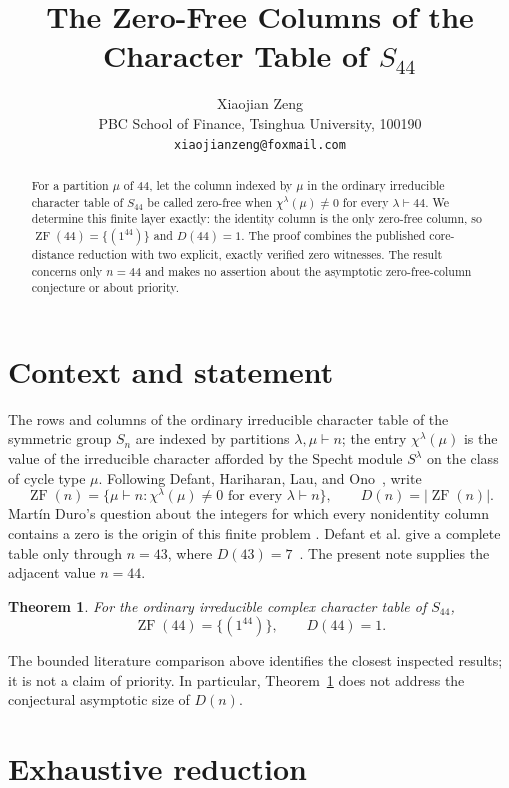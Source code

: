 \documentclass[11pt]{article}
\title{The Zero-Free Columns of the Character Table of $S_{44}$}
\author{Xiaojian Zeng\\
PBC School of Finance, Tsinghua University, 100190\\
\texttt{xiaojianzeng@foxmail.com}}
\date{}
\newtheorem{theorem}{Theorem}
\newcommand{\ZF}{\operatorname{ZF}}
\begin{document}
\maketitle

\begin{abstract}
For a partition $\mu$ of $44$, let the column indexed by $\mu$ in the
ordinary irreducible character table of $S_{44}$ be called zero-free when
$\chi^\lambda(\mu)\ne0$ for every $\lambda\vdash44$.  We determine this
finite layer exactly: the identity column is the only zero-free column, so
$\ZF(44)=\{(1^{44})\}$ and $D(44)=1$.  The proof combines the published
core-distance reduction with two explicit, exactly verified zero witnesses.
The result concerns only $n=44$ and makes no assertion about the asymptotic
zero-free-column conjecture or about priority.
\end{abstract}

\section{Context and statement}

The rows and columns of the ordinary irreducible character table of the
symmetric group $S_n$ are indexed by partitions $\lambda,\mu\vdash n$; the
entry $\chi^\lambda(\mu)$ is the value of the irreducible character afforded
by the Specht module $S^\lambda$ on the class of cycle type $\mu$.  Following
Defant, Hariharan, Lau, and Ono~\cite{DefantEtAl2026}, write
\[
 \ZF(n)=\{\mu\vdash n: \chi^\lambda(\mu)\ne0
          \text{ for every }\lambda\vdash n\},
 \qquad D(n)=|\ZF(n)|.
\]
Mart\'in Duro's question about the integers for which every nonidentity
column contains a zero is the origin of this finite problem
\cite[Question~4.17]{MartinDuro2026}.  Defant et al. give a complete table
only through $n=43$, where $D(43)=7$~\cite[Section~8.2]{DefantEtAl2026}.
The present note supplies the adjacent value $n=44$.

\begin{theorem}\label{thm:main}
For the ordinary irreducible complex character table of $S_{44}$,
\[
             \ZF(44)=\{(1^{44})\},\qquad D(44)=1.
\]
\end{theorem}

The bounded literature comparison above identifies the closest inspected
results; it is not a claim of priority.  In particular, Theorem~\ref{thm:main}
does not address the conjectural asymptotic size of $D(n)$.

\section{Exhaustive reduction}
\end{document}
